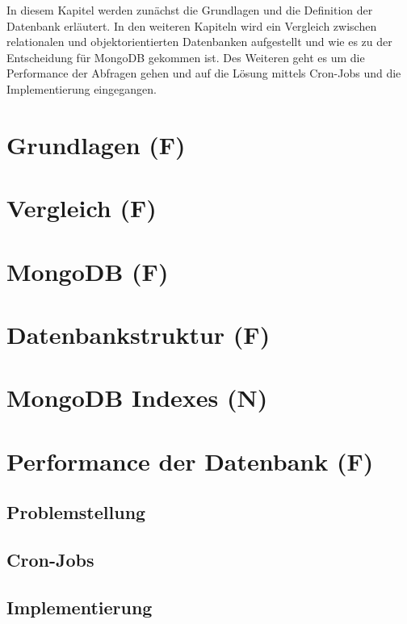 In diesem Kapitel werden zunächst die Grundlagen und die Definition der Datenbank erläutert. In den weiteren Kapiteln wird ein Vergleich zwischen relationalen und objektorientierten Datenbanken aufgestellt und wie es zu der Entscheidung für MongoDB gekommen ist. Des Weiteren geht es um die Performance der Abfragen gehen und auf die Lösung mittels Cron-Jobs und die Implementierung eingegangen.

\section{Grundlagen (F)}


\section{Vergleich (F)}


\section{MongoDB (F)}


\section{Datenbankstruktur (F)}


\section{MongoDB Indexes (N)}


\section{Performance der Datenbank (F)}


\subsection{Problemstellung}


\subsection{Cron-Jobs}


\subsection{Implementierung}
